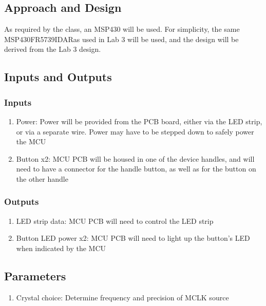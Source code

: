 \documentclass{notes}
\begin{document}
\subsection{Approach and Design}

As required by the class, an MSP430 will be used.
For simplicity, the same MSP430FR5739IDAR\footnotemark as used in Lab 3 will be used, and the design will be derived from the Lab 3 design.

\subsection{Inputs and Outputs}

\subsubsection{Inputs}

\begin{enumerate}
    \item Power: Power will be provided from the PCB board, either via the LED strip, or via a separate wire. Power may have to be stepped down to safely power the MCU
    \item Button x2: MCU PCB will be housed in one of the device handles, and will need to have a connector for the handle button, as well as for the button on the other handle
\end{enumerate}

\subsubsection{Outputs}

\begin{enumerate}
    \item LED strip data: MCU PCB will need to control the LED strip
    \item Button LED power x2: MCU PCB will need to light up the button's LED when indicated by the MCU
\end{enumerate}

\subsection{Parameters}

\begin{enumerate}
    \item Crystal choice: Determine frequency and precision of MCLK source
\end{enumerate}
\end{document}
